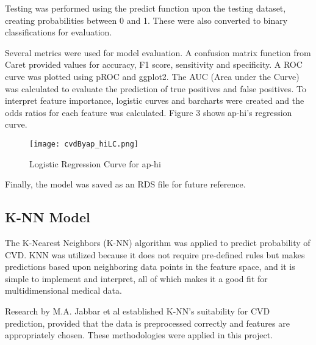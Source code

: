 \documentclass[conference]{IEEEtran}
\begin{document}
Testing was performed using the predict function upon the testing dataset, creating probabilities between 0 and 1. These were also converted to binary classifications for evaluation. 

Several metrics were used for model evaluation. A confusion matrix function from Caret provided values for accuracy, F1 score, sensitivity and specificity. A ROC curve was plotted using pROC and ggplot2. The AUC (Area under the Curve) was calculated to evaluate the prediction of true positives and false positives. To interpret feature importance, logistic curves and barcharts were created and the odds ratios for each feature was calculated. Figure 3 shows ap-hi's regression curve. 

\begin{figure}[htbp]
\centerline{\texttt{[image: cvdByap\_hiLC.png]}}
\caption{Logistic Regression Curve for ap-hi}
\label{fig}
\end{figure}

Finally, the model was saved as an RDS file for future reference. 

\subsection{K-NN Model}

The K-Nearest Neighbors (K-NN) algorithm was applied to predict probability of CVD. KNN was utilized because it does not require pre-defined rules but makes predictions based upon neighboring data points in the feature space, and it is simple to implement and interpret, all of which makes it a good fit for multidimensional medical data. 

Research by M.A. Jabbar et al \cite{KNN} established K-NN's suitability for CVD prediction, provided that the data is preprocessed correctly and features are appropriately chosen. These methodologies were applied in this project. 
\end{document}
